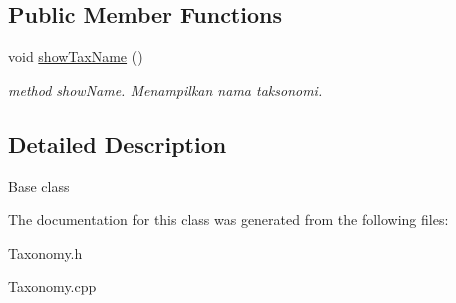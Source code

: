 \subsection*{Public Member Functions}
\begin{DoxyCompactItemize}
\item 
void \hyperlink{classAves_ad714c106a9b2d932ffb9fbac8b820afd}{show\+Tax\+Name} ()\hypertarget{classAves_ad714c106a9b2d932ffb9fbac8b820afd}{}\label{classAves_ad714c106a9b2d932ffb9fbac8b820afd}

\begin{DoxyCompactList}\small\item\em method show\+Name. Menampilkan nama taksonomi. \end{DoxyCompactList}\end{DoxyCompactItemize}


\subsection{Detailed Description}
Base class 

The documentation for this class was generated from the following files\+:\begin{DoxyCompactItemize}
\item 
Taxonomy.\+h\item 
Taxonomy.\+cpp\end{DoxyCompactItemize}

